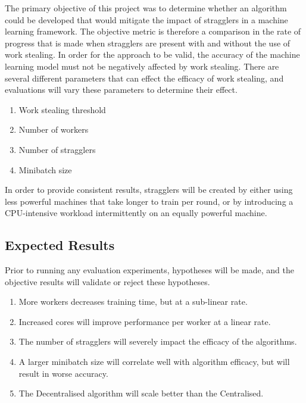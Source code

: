 \documentclass[12pt]{article}
\begin{document}
The primary objective of this project was to determine whether an algorithm could be developed that would mitigate the impact of stragglers in a machine learning framework. The objective metric is therefore a comparison in the rate of progress that is made when stragglers are present with and without the use of work stealing. In order for the approach to be valid, the accuracy of the machine learning model must not be negatively affected by work stealing.
\newline
\newline
There are several different parameters that can effect the efficacy of work stealing, and evaluations will vary these parameters to determine their effect.

\begin{enumerate}
\item Work stealing threshold
\item Number of workers
\item Number of stragglers
\item Minibatch size
\end{enumerate}

In order to provide consistent results, stragglers will be created by either using less powerful machines that  take longer to train per round, or by introducing a CPU-intensive workload intermittently on an equally powerful machine.

\subsection{Expected Results}
Prior to running any evaluation experiments, hypotheses will be made, and the objective results will validate or reject these hypotheses.

\begin{enumerate}
\item More workers decreases training time, but at a sub-linear rate.
\item Increased cores will improve performance per worker at a linear rate.
\item The number of stragglers will severely impact the efficacy of the algorithms.
\item A larger minibatch size will correlate well with algorithm efficacy, but will result in worse accuracy.
\item The Decentralised algorithm will scale better than the Centralised.
\end{enumerate}
\end{document}
